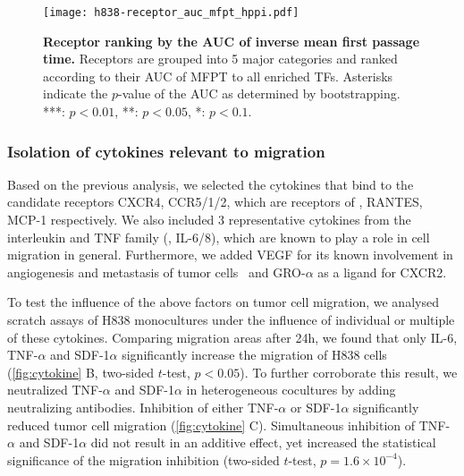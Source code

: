 \begin{figure}[!ht]
\begin{center}
\texttt{[image: h838-receptor\_auc\_mfpt\_hppi.pdf]}
\end{center}
\caption[Receptor ranking by inverse MFPT]{
{\bf Receptor ranking by the AUC of inverse mean first 
passage time.} 
Receptors are grouped into 5 major categories and ranked
according to their AUC of MFPT to all enriched TFs.
Asterisks indicate the $p$-value of the AUC as determined by
bootstrapping. ***: $p<0.01$, **: $p<0.05$, *: $p<0.1$.
}
\label{fig:h838_receptor_auc_mfpt}
\end{figure}

\subsubsection{Isolation of cytokines relevant to migration}

Based on the previous analysis, 
we selected the cytokines that bind to the candidate
receptors CXCR4, CCR5/1/2, which are receptors of \sdfonea,
RANTES, MCP-1 respectively. We also included 3 
representative cytokines from the interleukin and TNF
family (\tnfa, IL-6/8), which are known to play a role
in cell migration in general.
Furthermore, we added VEGF for its known involvement in
angiogenesis and metastasis of tumor cells~\citep{Ferrara2003,Hiratsuka2002} and GRO-$\alpha$ as a ligand for CXCR2.

To test the influence of the above factors on tumor cell migration,
we analysed scratch assays of H838 monocultures under the influence of 
individual or multiple of these cytokines. 
Comparing migration areas after 24h, 
we found that only IL-6, TNF-$\alpha$ and SDF-1$\alpha$ significantly 
increase the migration of H838 cells (\ref{fig:cytokine} B, two-sided $t$-test,
$p < 0.05$). 
To further corroborate this result, we neutralized 
TNF-$\alpha$ and SDF-1$\alpha$ in heterogeneous cocultures  by adding neutralizing antibodies.
Inhibition of  either TNF-$\alpha$ or SDF-1$\alpha$ significantly reduced tumor cell migration (\ref{fig:cytokine} C). 
Simultaneous inhibition of TNF-$\alpha$ and SDF-1$\alpha$ did not result in an additive effect, yet increased the statistical significance of the migration 
inhibition
(two-sided $t$-test, $p=1.6\times10^{-4}$).

